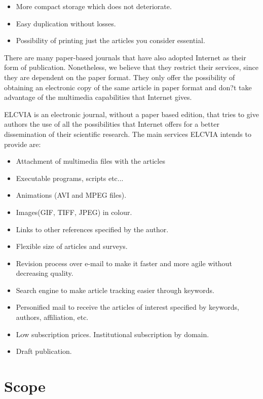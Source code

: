 \documentclass[twoside,a4paper,11pt]{article}
\begin{document}
\begin{itemize}
\item More compact storage which does not deteriorate.
\item Easy duplication without losses.
\item Possibility of printing just the articles you consider essential.
\end{itemize}

There are many paper-based journals that have also adopted Internet
as their form of publication. Nonetheless, we believe that they
restrict their services, since they are dependent on the paper format.
They only offer the possibility of obtaining an electronic copy of the
same article in paper format and don?t take advantage of the multimedia
capabilities that Internet gives.

ELCVIA is an electronic journal, without a paper based edition, that
tries to give authors the use of all the possibilities that Internet
offers for a better dissemination of their scientific research. The
main services ELCVIA intends to provide are:

\begin{itemize}
\item Attachment of multimedia files with the articles
\item Executable programs, scripts etc...
\item Animations (AVI and MPEG files).
\item Images(GIF, TIFF, JPEG) in colour.
\item Links to other references specified by the author.
\item Flexible size of articles and surveys.
\item Revision process over e-mail to make it faster and more
      agile without decreasing quality.
\item Search engine to make article tracking easier through keywords.
\item Personified mail to receive the articles of interest
specified by keywords, authors, affiliation, etc.
\item Low subscription prices. Institutional subscription by domain.
\item Draft publication.
\end{itemize}

\section{Scope}
\end{document}
